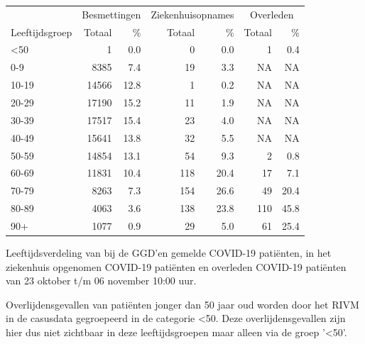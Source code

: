 \documentclass[
  english,
  man,floatsintext]{apa6}
\begin{document}
\begin{table}
\centering\begingroup\fontsize{11}{13}\selectfont

\begin{threeparttable}
\begin{tabular}{lrrrrrr}
\toprule
\multicolumn{1}{c}{ } & \multicolumn{2}{c}{Besmettingen} & \multicolumn{2}{c}{Ziekenhuisopnames} & \multicolumn{2}{c}{Overleden} \\
\cmidrule(l{3pt}r{3pt}){2-3} \cmidrule(l{3pt}r{3pt}){4-5} \cmidrule(l{3pt}r{3pt}){6-7}
Leeftijdsgroep & Totaal & \% & Totaal & \% & Totaal & \%\\
\midrule
<50 & 1 & 0.0 & 0 & 0.0 & 1 & 0.4\\
0-9 & 8385 & 7.4 & 19 & 3.3 & NA & NA\\
10-19 & 14566 & 12.8 & 1 & 0.2 & NA & NA\\
20-29 & 17190 & 15.2 & 11 & 1.9 & NA & NA\\
30-39 & 17517 & 15.4 & 23 & 4.0 & NA & NA\\
40-49 & 15641 & 13.8 & 32 & 5.5 & NA & NA\\
50-59 & 14854 & 13.1 & 54 & 9.3 & 2 & 0.8\\
60-69 & 11831 & 10.4 & 118 & 20.4 & 17 & 7.1\\
70-79 & 8263 & 7.3 & 154 & 26.6 & 49 & 20.4\\
80-89 & 4063 & 3.6 & 138 & 23.8 & 110 & 45.8\\
90+ & 1077 & 0.9 & 29 & 5.0 & 61 & 25.4\\
\bottomrule
\end{tabular}
\begin{tablenotes}
\item[1] Leeftijdsverdeling van bij de GGD’en gemelde COVID-19 patiënten, in het ziekenhuis opgenomen COVID-19 patiënten en overleden COVID-19 patiënten van 23 oktober t/m 06 november 10:00 uur.
\item[2] Overlijdensgevallen van patiënten jonger dan 50 jaar oud worden door het RIVM in de casusdata gegroepeerd in de categorie <50. Deze overlijdensgevallen zijn hier dus niet zichtbaar in deze leeftijdsgroepen maar alleen via de groep '<50'.
\end{tablenotes}
\end{threeparttable}
\endgroup{}
\end{table}

\newpage
\end{document}
